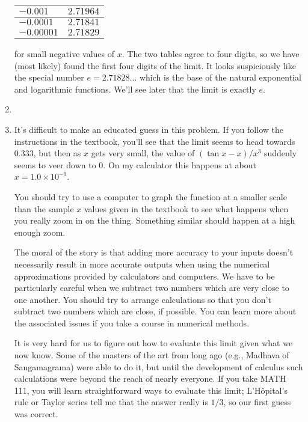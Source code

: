 \documentclass{article}
\begin{document}
\begin{enumerate}
\begin{center}
\begin{tabular}{|l|r|}
      \hline
      $-0.001$   & $2.71964$ \\
      \hline
      $-0.0001$  & $2.71841$ \\
      \hline 
      $-0.00001$ & $2.71829$ \\
      \hline
    \end{tabular}
  \end{center}
  for small negative values of $x$.  The two tables agree to four
  digits, so we have (most likely) found the first four digits of the
  limit.  It looks suspiciously like the special number
  $e=2.71828\ldots$ which is the base of the natural exponential and
  logarithmic functions.  We'll see later that the limit is exactly $e$.
\item %
\item %
  It's difficult to make an educated guess in this problem.  If you
  follow the instructions in the textbook, you'll see that the limit
  seems to head towards $0.333$, but then as $x$ gets very small, the
  value of $(\tan x -x)/x^3$ suddenly seems to veer down to $0$.  On
  my calculator this happens at about $x=1.0\times 10^{-9}$.

  You should try to use a computer to graph the function at a smaller
  scale than the sample $x$ values given in the textbook to see what
  happens when you really zoom in on the thing.  Something similar
  should happen at a high enough zoom.

  The moral of the story is that adding more accuracy to your inputs
  doesn't necessarily result in more accurate outputs when using the
  numerical approximations provided by calculators and computers.  We
  have to be particularly careful when we subtract two numbers which
  are very close to one another.  You should try to arrange
  calculations so that you don't subtract two numbers which are close,
  if possible.  You can learn more about the associated issues if you
  take a course in numerical methods.

  It is very hard for us to figure out how to evaluate this limit
  given what we now know.  Some of the masters of the art from long
  ago (e.g., Madhava of Sangamagrama) were able to do it, but until
  the development of calculus such calculations were beyond the reach
  of nearly everyone.  If you take MATH 111, you will learn
  straightforward ways to evaluate this limit; L'H\^{o}pital's rule or
  Taylor series tell me that the answer really is $1/3$, so our first
  guess was correct.
\end{enumerate}
\end{document}
